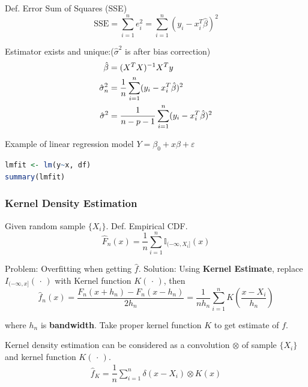     Def. Error Sum of Squares (SSE)
    \begin{equation}\mathrm{SSE}=\sum_{i=1}^ne_i^2=\sum_{i=1}^n(y_i-x_i^T\hat{\beta })^2\end{equation}

    Estimator exists and unique:($\hat{\sigma}^2$ is after bias correction)
    \begin{align}
        \hat{\beta}&=(X^TX)^{-1}X^Ty\notag \\
        \hat{\sigma}_n^2&=\frac{1}{n}\sum_{i=1}^n(y_i-x^T_i\hat{\beta})^2 \notag\\ 
        \hat{\sigma}^2&=\frac{1}{n-p-1}\sum_{i=1}^n(y_i-x_i^T\hat{\beta})^2\label{EqaEstimatorSigmaWithDoF}
    \end{align}

\begin{rcode}
    Example of linear regression model $ Y = \beta _0+x\beta +\varepsilon  $
\begin{lstlisting}[language=R]
lmfit <- lm(y~x, df)
summary(lmfit)
\end{lstlisting}
\end{rcode}

    

\subsubsection{Kernel Density Estimation}\label{SubSectionKernelDensityEstimation}
    Given random sample $\{X_i\}$. Def. Empirical CDF.
    \begin{equation}\label{empiricaldisreibutionfunction}
        \hat{F}_n(x)=\frac{1}{n}\sum_{i=1}^n\mathbb{I}_{(-\infty,X_i]}(x) 
    \end{equation}
        

    Problem: Overfitting when getting $\hat{f}$. Solution: Using \textbf{Kernel Estimate}, replace $I_{(-\infty,x]}(\,\cdot\,)$ with Kernel function $K(\,\cdot\,)$, then
    \begin{equation}
        \hat{f}_n(x)=\dfrac{F_n(x+h_n)-F_n(x-h_n)}{2h_n}=\frac{1}{nh_n}\sum_{i=1}^nK(\frac{x-X_i}{h_n})
    \end{equation}

    where $h_n$ is \textbf{bandwidth}. Take proper kernel function $K$ to get estimate of $f$.

    Kernel density estimation can be considered as a convolution $ \otimes $ of sample $\{X_i\}$ and kernel function $K(\, \cdot \, )$.
    \begin{align}
        \hat{f}_K= \dfrac{1}{n}\sum_{i=1}^n\delta (x-X_i) \otimes K(x)
    \end{align}
    
